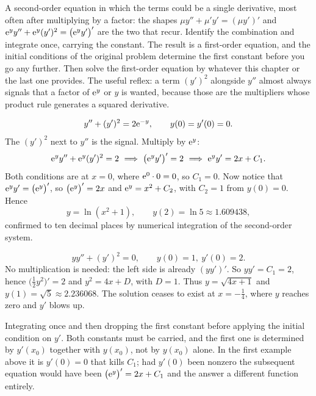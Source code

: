 \cue A second-order equation in which the terms could be a single derivative, most often after multiplying by a factor: the shapes $\mu y''+\mu'y'=(\mu y')'$ and $\mathrm{e}^{y}y''+\mathrm{e}^{y}(y')^{2}=\bigl(\mathrm{e}^{y}y'\bigr)'$ are the two that recur.
\method Identify the combination and integrate once, carrying the constant. The result is a first-order equation, and the initial conditions of the original problem determine the first constant before you go any further. Then solve the first-order equation by whatever this chapter or the last one provides. The useful reflex: a term $(y')^{2}$ alongside $y''$ almost always signals that a factor of $\mathrm{e}^{y}$ or $y$ is wanted, because those are the multipliers whose product rule generates a squared derivative.

\begin{worked}
\[y''+(y')^{2}=2\mathrm{e}^{-y},\qquad y(0)=y'(0)=0.\]
The $(y')^{2}$ next to $y''$ is the signal. Multiply by $\mathrm{e}^{y}$:
\[\eu^{y}y''+\eu^{y}(y')^{2}=2\ \Longrightarrow\ \bigl(\eu^{y}y'\bigr)'=2\ \Longrightarrow\ \eu^{y}y'=2x+C_1.\]
Both conditions are at $x=0$, where $\mathrm{e}^{0}\cdot0=0$, so $C_1=0$. Now notice that $\mathrm{e}^{y}y'=\bigl(\mathrm{e}^{y}\bigr)'$, so $\bigl(\mathrm{e}^{y}\bigr)'=2x$ and $\mathrm{e}^{y}=x^{2}+C_2$, with $C_2=1$ from $y(0)=0$. Hence
\[y=\ln(x^{2}+1),\qquad y(2)=\ln5\approx1.609438,\]
confirmed to ten decimal places by numerical integration of the second-order system.
\end{worked}

\begin{worked}
\[yy''+(y')^{2}=0,\qquad y(0)=1,\ y'(0)=2.\]
No multiplication is needed: the left side is already $(yy')'$. So $yy'=C_1=2$, hence $\bigl(\tfrac12y^{2}\bigr)'=2$ and $y^{2}=4x+D$, with $D=1$. Thus $y=\sqrt{4x+1}$ and $y(1)=\sqrt5\approx2.236068$. The solution ceases to exist at $x=-\tfrac14$, where $y$ reaches zero and $y'$ blows up.
\end{worked}

\begin{trap}
Integrating once and then dropping the first constant before applying the initial condition on $y'$. Both constants must be carried, and the first one is determined by $y'(x_0)$ together with $y(x_0)$, not by $y(x_0)$ alone. In the first example above it is $y'(0)=0$ that kills $C_1$; had $y'(0)$ been nonzero the subsequent equation would have been $\bigl(\mathrm{e}^{y}\bigr)'=2x+C_1$ and the answer a different function entirely.
\end{trap}


